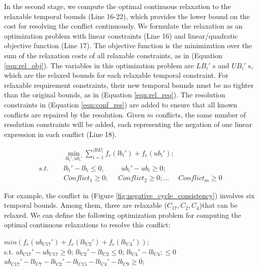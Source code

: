 \documentclass[jair,twoside,11pt,theapa]{article}
\begin{document}
In the second stage, we compute the optimal continuous relaxation to the
relaxable temporal bounds (Line 16-22), which provides the lower bound on the
cost for resolving the conflict continuously. We formulate the relaxation as an optimization
problem with linear constraints (Line 16) and linear/quadratic objective
function (Line 17). The objective function is the minimization over the sum of
the relaxation costs of all relaxable constraints, as in (Equation \ref{eqn:rel_obj}).
The variables in this optimization problem are $LB_i'$ s and $UB_i'$ s, which
are the relaxed bounds for each relaxable temporal constraint. For relaxable
requirement constraints, their new temporal bounds must be no tighter than the
original bounds, as in (Equation \ref{eqn:rel_req}). The resolution constraints in
(Equation \ref{eqn:conf_res}) are added to ensure that all known conflicts are repaired
by the resolution. Given $m$ conflicts, the same number of resolution
constraints will be added, each representing the negation of one linear
expression in each conflict (Line 18).

\begin{problem}
	\begin{align}
		&\phantom{=}	\min_{lb_i',ub_i'}\sum\limits_{i=1}^{|RE|}f_{e}(lb_i')+f_{e}(ub_i'); \label{eqn:rel_obj}\\
		s.t. &\phantom{=} lb_i'-lb_i \leq 0, \quad \phantom{=} ub_i'-ub_i \geq 0; \label{eqn:rel_req}\\
		&\phantom{=} Conflict_1 \geq 0; \phantom{=} Conflict_2 \geq 0;  ... \phantom{=} Conflict_m \geq 0 \label{eqn:conf_res}
	\end{align}
	\label{prob:conflict_resolution_consistency}
\end{problem}

For example, the conflict in (Figure \ref{fig:negative_cycle_consistency})
involves six temporal bounds. Among them, three are relaxable
($C_{17},C_2,C_4$)that can be relaxed. We can define the following optimization
problem for computing the optimal continuous relaxations to resolve this
conflict:


\begin{center}
	$min(f_e(ub_{C17}')+f_e(lb_{C2}')+f_e(lb_{C4}'))$;\\
	s.t. $ub_{C17}'-ub_{C17}\geq 0$; $lb_{C2}'-lb_{C2}\leq 0$; $lb_{C4}'-lb_{C4};\leq 0$\\
	$ub_{C17}'-lb_{C7}-lb_{C2}'-lb_{C15}-lb_{C4}'-lb_{C9}\geq 0$;\\	
\end{center}
\end{document}
